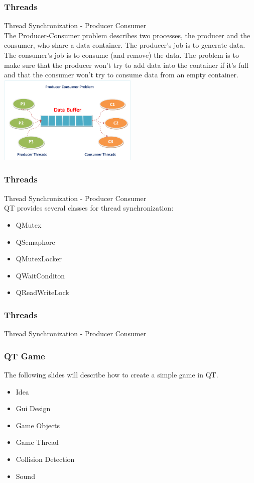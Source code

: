 \begin{frame}[fragile]
\frametitle{Threads}
Thread Synchronization - Producer Consumer\\
{\tiny
The Producer-Consumer problem describes two processes, the producer and the consumer, who share a data container. The producer's job is to generate data. The consumer's job is to consume (and remove) the data. The problem is to make sure that the producer won't try to add data into the container if it's full and that the consumer won't try to consume data from an empty container.
}
\includegraphics[width=190pt]{img/prodcon.png}

\end{frame}

\begin{frame}[fragile]
\frametitle{Threads}
Thread Synchronization - Producer Consumer\\
QT provides several classes for thread synchronization:
\begin{itemize}
\item QMutex
\item QSemaphore
\item QMutexLocker
\item QWaitConditon
\item QReadWriteLock
\end{itemize}

\end{frame}

\begin{frame}[fragile]
\frametitle{Threads}
Thread Synchronization - Producer Consumer\\
{\tiny

}

\end{frame}

\begin{frame}[fragile]
\frametitle{QT Game}
The following slides will describe how to create a simple game in QT.
\begin{itemize}
\item Idea
\item Gui Design
\item Game Objects
\item Game Thread
\item Collision Detection
\item Sound
\end{itemize}
\end{frame}

